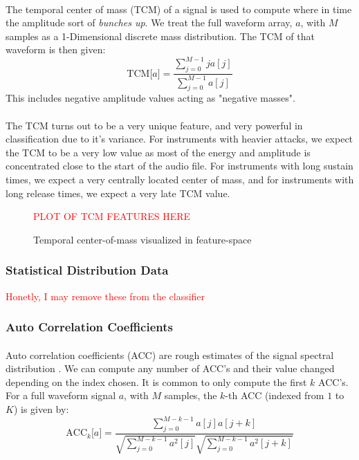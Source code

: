 \documentclass[12pt,letterpaper]{article}
\begin{document}
\paragraph*{}The temporal center of mass (TCM) of a signal is used to compute where in time the amplitude sort of \textit{bunches up}. We treat the full waveform array, $a$, with $M$ samples as a 1-Dimensional discrete mass distribution. The TCM of that waveform is then given:
\begin{equation}
\label{eqn-FeatureTCM}
\text{TCM}\big[ a \big] = \frac{\sum_{j=0}^{M-1}j a[j]}{\sum_{j=0}^{M-1}a[j]}
\end{equation}
This includes negative amplitude values acting as "negative masses".

\paragraph*{}The TCM turns out to be a very unique feature, and very powerful in classification due to it's variance. For instruments with heavier attacks, we expect the TCM to be a very low value as most of the energy and amplitude is concentrated close to the start of the audio file. For instruments with long sustain times, we expect a very centrally located center of mass, and for instruments with long release times, we expect a very late TCM value.

\begin{figure}[H]
\label{fig-FeatureTCM}
\begin{center}
\textcolor{red}{PLOT OF TCM FEATURES HERE}
\end{center}
\caption{Temporal center-of-mass visualized in feature-space}
\end{figure}

\subsubsection{Statistical Distribution Data}
\textcolor{red}{Honetly, I may remove these from the classifier}

\subsubsection{Auto Correlation Coefficients}

\paragraph*{}Auto correlation coefficients (ACC) are rough estimates of the signal spectral distribution \cite{Virtanen}. We can compute any number of ACC's and their value changed depending on the index chosen. It is common to only compute the first $k$ ACC's. For a full waveform signal $a$, with $M$ samples, the $k$-th ACC (indexed from $1$ to $K$) is given by:
\begin{equation}
\label{eqn-FeatureACC}
\text{ACC}_k\big[ a \big] = \frac{\sum_{j=0}^{M-k-1}a[j]a[j+k]} {\sqrt{\sum_{j=0}^{M-k-1}a^2[j]} \sqrt{\sum_{j=0}^{M-k-1}a^2[j+k]}}
\end{equation}
\end{document}
